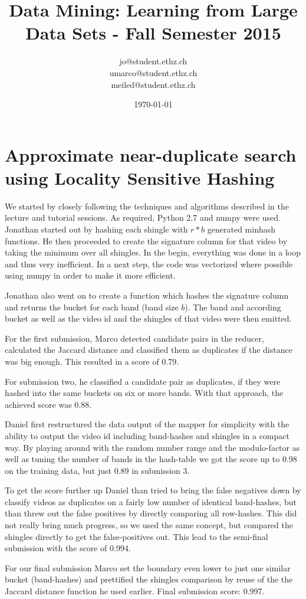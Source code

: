 \documentclass[a4paper, 11pt]{article}
\title{Data Mining: Learning from Large Data Sets - Fall Semester 2015}
\author{jo@student.ethz.ch\\ umarco@student.ethz.ch\\ meiled@student.ethz.ch\\}
\date{\today}
\begin{document}
\maketitle

\section*{Approximate near-duplicate search using Locality Sensitive Hashing}
We started by closely following the techniques and algorithms described in the lecture and tutorial sessions. As required, Python 2.7 and numpy were used.
Jonathan started out by hashing each shingle with $r * b$ generated minhash functions. He then proceeded to create the signature column for that video by taking the minimum over all shingles.
In the begin, everything was done in a loop and thus very inefficient. In a next step, the code was vectorized where possible using numpy in order to make it more efficient.

Jonathan also went on to create a function which hashes the signature column and returns the bucket for each band (band size $b$). The band and according bucket as well as the video id and the shingles of that video were then emitted.

For the first submission, Marco detected candidate pairs in the reducer, calculated the Jaccard distance and classified them as duplicates if the distance was big enough. This resulted in a score of 0.79.

For submission two, he classified a candidate pair as duplicates, if they were hashed into the same buckets on six or more bands. With that approach, the achieved score was 0.88.

Daniel first restructured the data output of the mapper for simplicity with the ability to output the video id including band-hashes and shingles in a compact way. By playing around with the random number range and the modulo-factor as well as tuning the number of bands in the hash-table we got the score up to 0.98 on the training data, but just 0.89 in submission 3.

To get the score further up Daniel than tried to bring the false negatives down by classify videos as duplicates on a fairly low number of identical band-hashes, but than threw out the false positives by directly comparing all row-hashes. This did not really bring much progress, so we used the same concept, but compared the shingles directly to get the false-positives out. This lead to the semi-final submission with the score of 0.994.

For our final submission Marco set the boundary even lower to just one similar bucket (band-hashes) and prettified the shingles comparison by reuse of the the Jaccard distance function he used earlier. Final submission score: 0.997.
\end{document}
